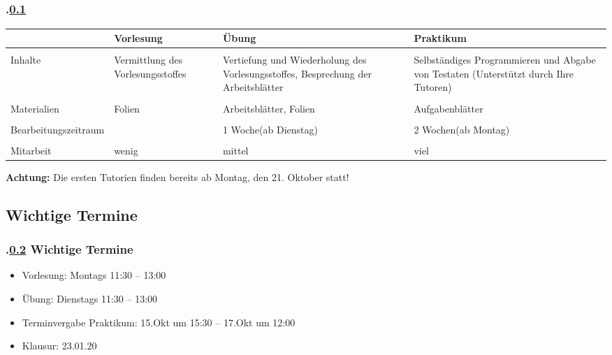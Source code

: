 \subsection{\stitle}\label{S:Einordnung}
\begin{frame}[fragile]%
  \frametitle{\kap.\ref{S:Einordnung} \stitle}%

  \begin{tabular}{p{2cm}|p{2.0cm}|p{2.7cm}|p{3.0cm}}
  & {\centering Vorlesung} & {\centering Übung} & {\centering Praktikum}\\
  \hline
  \hline & & &  \\
  Inhalte & Vermittlung des Vorlesungs\-stoffes & Vertiefung und Wiederholung des Vorlesungsstoffes, Besprechung der Arbeitsblätter & Selbständiges Programmieren und Abgabe von Testaten (Unterstützt durch Ihre Tutoren)\\
  \hline & & & \\
  Materialien & Folien & Arbeitsblätter, Folien & Aufgabenblätter\\
  \hline & & & \\
  Be\-ar\-bei\-tungs\-zeit\-raum & & 1 Woche\newline (ab Dienstag) & 2 Wochen\newline  (ab Montag)\\
  \hline & & & \\
  Mitarbeit & wenig & mittel & viel
  \end{tabular}
  \vfill

  \textbf{Achtung:} Die ersten Tutorien finden bereits ab Montag, den 21. Oktober statt!
\end{frame}


\def\stitle{Wichtige Termine}%
\subsection{\stitle}\label{S:Termine}
\begin{frame}[fragile]%
  \frametitle{\kap.\ref{S:Termine} \stitle}%

\begin{itemize}
  \item Vorlesung: Montags 11:30 -- 13:00
  \item Übung: Dienstags 11:30 -- 13:00
  \item Terminvergabe Praktikum: 15.Okt um 15:30 -- 17.Okt um 12:00
  \item Klausur: 23.01.20
\end{itemize}
\end{frame}
